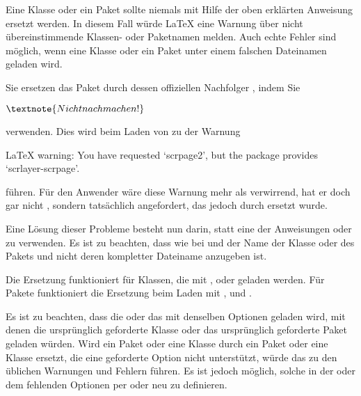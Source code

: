 \begin{Declaration}
\end{Declaration}
Eine Klasse oder ein
Paket sollte niemals mit Hilfe der oben erklärten Anweisung
 ersetzt werden. In diesem Fall würde
\LaTeX{} eine Warnung über nicht übereinstimmende Klassen- oder Paketnamen
melden. Auch echte Fehler sind möglich, wenn eine Klasse oder ein Paket unter
einem falschen Dateinamen geladen wird.
\begin{Example}
  Sie ersetzen das Paket  durch dessen offiziellen
  Nachfolger , indem Sie
\begin{lstcode}[escapechar=\$]
  $\textnote{Nicht nachmachen!}$
\end{lstcode}
  verwenden. Dies wird beim Laden von  zu der Warnung
\begin{lstcode}
  LaTeX warning: You have requested `scrpage2',
                 but the package provides
                 `scrlayer-scrpage'.
\end{lstcode}
  führen. Für den Anwender wäre diese Warnung mehr als verwirrend, hat er doch
  gar nicht , sondern tatsächlich 
  angefordert, das jedoch durch  ersetzt wurde.
\end{Example}
Eine Lösung dieser Probleme besteht nun darin, statt
 eine der Anweisungen
 oder  zu verwenden. Es ist zu
beachten, dass wie bei  und  der Name
der Klasse oder des Pakets und nicht deren kompletter Dateiname anzugeben ist.

Die Ersetzung funktioniert für Klassen, die mit
,  oder 
geladen werden. Für Pakete funktioniert die Ersetzung beim Laden mit
,  und
.

Es ist zu beachten, dass die  oder das
 mit denselben Optionen geladen wird, mit denen die
ursprünglich geforderte Klasse oder das ursprünglich geforderte Paket geladen
würden. Wird ein Paket oder eine Klasse durch ein Paket oder eine Klasse
ersetzt, die eine geforderte Option nicht unterstützt, würde das zu den
üblichen Warnungen und Fehlern führen. Es ist jedoch möglich, solche in der
 oder dem  fehlenden Optionen per
 oder
 neu zu definieren.

